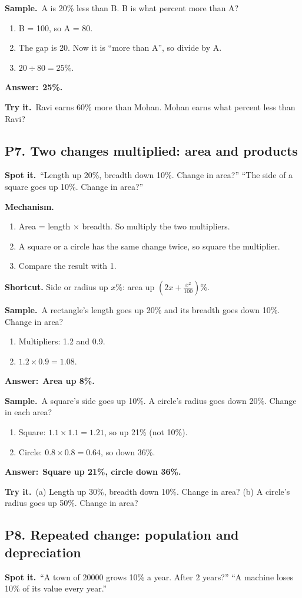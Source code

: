\documentclass[11pt,a4paper]{article}
\let\oldsubsection\subsection
\renewcommand{\subsection}{\needspace{9\baselineskip}\oldsubsection}
\newcommand{\spot}{\textbf{\color{ember}Spot it.}\ }
\newcommand{\mech}{\textbf{\color{ember}Mechanism.}\ }
\newif\ifkeepsamp
\newcommand{\ans}[1]{\par\nopagebreak\noindent\textbf{\color{ember}Answer:}\ \textbf{#1}\par}
\newcommand{\samp}{\ifkeepsamp\needspace{4\baselineskip}\fi\textbf{\color{ember}Sample.}\ }
\newcommand{\tryit}[1]{\textbf{\color{ember}Try it.}\ #1}
\begin{document}
\samp A is 20\% less than B. B is what percent more than A?
\begin{enumerate}
\item B = 100, so A = 80.
\item The gap is 20. Now it is ``more than A'', so divide by A.
\item $20 \div 80 = 25\%$.
\end{enumerate}
\ans{25\%.}

\tryit Ravi earns 60\% more than Mohan. Mohan earns what percent less than Ravi?

\subsection{P7. Two changes multiplied: area and products}
\spot ``Length up 20\%, breadth down 10\%. Change in area?'' ``The side of a square goes up 10\%. Change in area?''

\mech
\begin{enumerate}
\item Area = length $\times$ breadth. So multiply the two multipliers.
\item A square or a circle has the same change twice, so square the multiplier.
\item Compare the result with 1.
\end{enumerate}
\textbf{Shortcut.} Side or radius up $x\%$: area up $\left(2x + \tfrac{x^2}{100}\right)\%$.

\samp A rectangle's length goes up 20\% and its breadth goes down 10\%. Change in area?
\begin{enumerate}
\item Multipliers: 1.2 and 0.9.
\item $1.2 \times 0.9 = 1.08$.
\end{enumerate}
\ans{Area up 8\%.}

\samp A square's side goes up 10\%. A circle's radius goes down 20\%. Change in each area?
\begin{enumerate}
\item Square: $1.1 \times 1.1 = 1.21$, so up 21\% (not 10\%).
\item Circle: $0.8 \times 0.8 = 0.64$, so down 36\%.
\end{enumerate}
\ans{Square up 21\%, circle down 36\%.}

\tryit (a) Length up 30\%, breadth down 10\%. Change in area? (b) A circle's radius goes up 50\%. Change in area?

\subsection{P8. Repeated change: population and depreciation}
\spot ``A town of 20000 grows 10\% a year. After 2 years?'' ``A machine loses 10\% of its value every year.''
\end{document}
